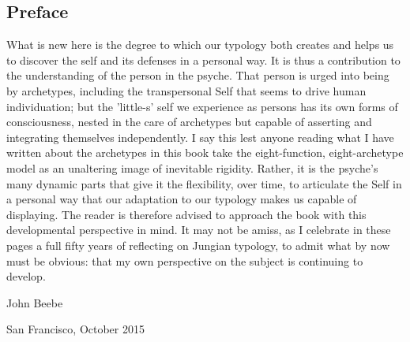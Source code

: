 \subsection*{Preface}

What is new here is the degree to which our typology both creates and helps us
to discover the self and its defenses in a personal way. It is thus a
contribution to the understanding of the person in the psyche. That person is
urged into being by archetypes, including the transpersonal Self that seems to
drive human individuation; but the 'little-s' self we experience as persons has
its own forms of consciousness, nested in the care of archetypes but capable of
asserting and integrating themselves independently. I say this lest anyone
reading what I have written about the archetypes in this book take the
eight-function, eight-archetype model as an unaltering image of inevitable
rigidity. Rather, it is the psyche's many dynamic parts that give it the
flexibility, over time, to articulate the Self in a personal way that our
adaptation to our typology makes us capable of displaying. The reader is
therefore advised to approach the book with this developmental perspective in
mind. It may not be amiss, as I celebrate in these pages a full fifty years of
reflecting on Jungian typology, to admit what by now must be obvious: that my
own perspective on the subject is continuing to develop.

John Beebe

San Francisco, October 2015
